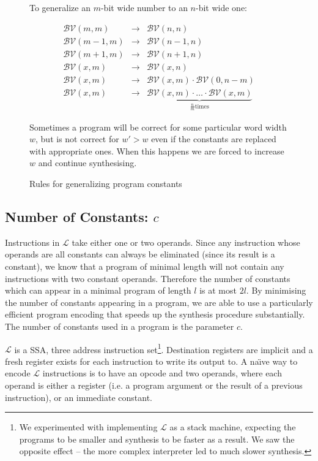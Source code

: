 \documentclass[a4paper]{llncs}
\newcommand{\bv}[2]{\mathcal{BV}(#1, #2)}
\begin{document}
\begin{figure}
To generalize an $m$-bit wide number to an $n$-bit wide one:

\begin{eqnarray*}
 \bv{m}{m} & \rightarrow & \bv{n}{n} \\
 \bv{m-1}{m} & \rightarrow & \bv{n-1}{n} \\
 \bv{m+1}{m} & \rightarrow & \bv{n+1}{n} \\
 \bv{x}{m} & \rightarrow & \bv{x}{n} \\
 \bv{x}{m} & \rightarrow & \bv{x}{m} \cdotp \bv{0}{n - m} \\
 \bv{x}{m} & \rightarrow & \underbrace{\bv{x}{m} \cdotp \ldots \cdotp \bv{x}{m}}_{\frac{n}{m} \mathrm{ times}}
\end{eqnarray*}

Sometimes a program will be correct for some particular word width $w$, but is
not correct for $w' > w$ even if the constants are replaced with appropriate ones.
When this happens we are forced to increase $w$ and continue synthesising.

\caption{Rules for generalizing program constants
 \label{fig:generalize}}
\end{figure}

\subsection{Number of Constants: $c$}
Instructions in $\mathcal{L}$ take either one or two operands.
Since any instruction whose operands are all constants can always be
eliminated (since its result is a constant), we know that a program
of minimal length will not contain any instructions with two constant
operands.  Therefore the number of constants which can appear in
a minimal program of length $l$ is at most $2l$.  By minimising the number
of constants appearing in a program, we are able to use a particularly
efficient program encoding that speeds up the synthesis procedure
substantially.  The number of constants used in a program is the parameter $c$.

$\mathcal{L}$ is a SSA, three address instruction set\footnote{
We experimented with implementing $\mathcal{L}$ as a stack machine, expecting
the programs to be smaller and synthesis to be faster as a result.  We saw
the opposite effect -- the more complex interpreter led to much slower synthesis.
}.  Destination registers
are implicit and a fresh register exists for each instruction to write its
output to.  A na\"{\i}ve way to encode $\mathcal{L}$ instructions is to have an
opcode and two operands, where each operand is either a register (i.e. a program argument
or the result of a previous instruction), or an immediate constant.
\end{document}
